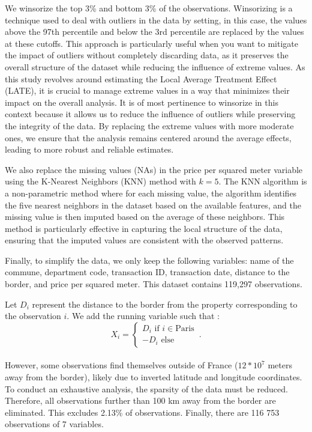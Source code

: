\documentclass[12pt]{article}
\theoremstyle{plain}
\theoremstyle{remark}
\begin{document}
We winsorize the top 3\% and bottom 3\% of the observations. Winsorizing is a technique used to deal with outliers in the data by setting, in this case, the values above the 97th percentile and below the 3rd percentile are replaced by the values at these cutoffs. This approach is particularly useful when you want to mitigate the impact of outliers without completely discarding data, as it preserves the overall structure of the dataset while reducing the influence of extreme values. As this study revolves around estimating the Local Average Treatment Effect (LATE), it is crucial to manage extreme values in a way that minimizes their impact on the overall analysis. It is of most pertinence to winsorize in this context because it allows us to reduce the influence of outliers while preserving the integrity of the data. By replacing the extreme values with more moderate ones, we ensure that the analysis remains centered around the average effects, leading to more robust and reliable estimates.

We also replace the missing values (NAs) in the price per squared meter variable using the K-Nearest Neighbors (KNN) method with $k=5$. The KNN algorithm is a non-parametric method where for each missing value, the algorithm identifies the five nearest neighbors in the dataset based on the available features, and the missing value is then imputed based on the average of these neighbors. This method is particularly effective in capturing the local structure of the data, ensuring that the imputed values are consistent with the observed patterns.

Finally, to simplify the data, we only keep the following variables: name of the commune, department code, transaction ID, transaction date, distance to the border, and price per squared meter. This dataset contains 119,297 observations.

Let $D_i$ represent the distance to the border from the property corresponding to the observation $i$. We add the running variable such that : 
\begin{equation}
X_i =
    \begin{cases}
      D_i \text{ if } i\in\text{Paris} \\
      -D_i \text{ else}
    \end{cases}\,.
\end{equation}
\\


However, some observations find themselves outside of France ($12*10^7$ meters away from the border), likely due to inverted latitude and longitude coordinates. To conduct an exhaustive analysis, the sparsity of the data must be reduced. Therefore, all observations further than 100 km away from the border are eliminated. This excludes 2.13\% of observations. Finally, there are 116 753 observations of 7 variables.
\end{document}
